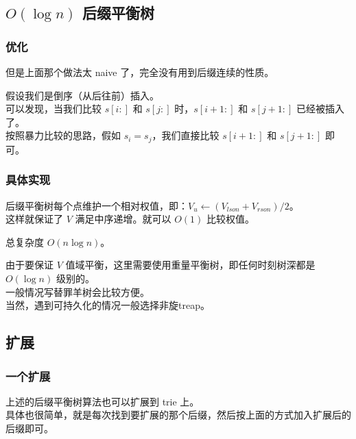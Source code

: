 \documentclass[UTF8]{beamer}
\begin{document}
\begin{CJK}{UTF8}{song}
\subsection{$O(\log n)$ 后缀平衡树}
\begin{frame}
	\frametitle{优化}
	但是上面那个做法太 naive 了，完全没有用到后缀连续的性质。
	\pause
	\par
	假设我们是倒序（从后往前）插入。\\
	可以发现，当我们比较 $s[i:]$ 和 $s[j:]$ 时，$s[i+1:]$ 和 $s[j+1:]$ 已经被插入了。\\
	按照暴力比较的思路，假如 $s_i= s_j$，我们直接比较 $s[i+1:]$ 和 $s[j+1:]$ 即可。
\end{frame}
\begin{frame}
	\frametitle{具体实现}
	后缀平衡树每个点维护一个相对权值，即：$V_u\leftarrow (V_{lson}+V_{rson})/2$。\\
	这样就保证了 $V$ 满足中序递增。就可以 $O(1)$ 比较权值。
	\pause
	\par
	总复杂度 $O(n\log n)$。
	\pause
	\par
	由于要保证 $V$ 值域平衡，这里需要使用重量平衡树，即任何时刻树深都是 $O(\log n)$ 级别的。\\
	一般情况写替罪羊树会比较方便。\\
	当然，遇到可持久化的情况一般选择非旋treap。
\end{frame}
\subsection{扩展}
\begin{frame}
	\frametitle{一个扩展}
	上述的后缀平衡树算法也可以扩展到 trie 上。\\
	具体也很简单，就是每次找到要扩展的那个后缀，然后按上面的方式加入扩展后的后缀即可。
\end{frame}

\end{CJK}
\end{document}
